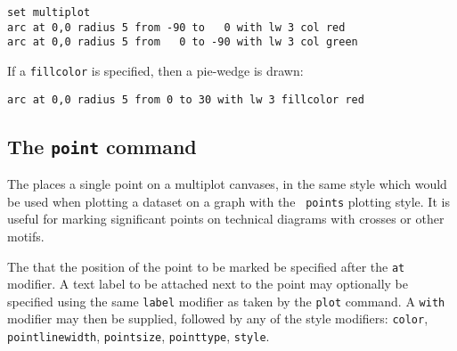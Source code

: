 \begin{verbatim}
set multiplot
arc at 0,0 radius 5 from -90 to   0 with lw 3 col red
arc at 0,0 radius 5 from   0 to -90 with lw 3 col green
\end{verbatim}

\noindent If a {\tt fillcolor} is specified, then a pie-wedge is drawn:

\begin{verbatim}
arc at 0,0 radius 5 from 0 to 30 with lw 3 fillcolor red
\end{verbatim}



\subsection{The {\tt point} command}
\label{sec:point}

The  places a single point on a multiplot canvases, in the same
style which would be used when plotting a dataset on a graph with the {\tt
points} plotting style. It is useful for marking significant points on
technical diagrams with crosses or other motifs.

The  that the position of the point to be marked be specified
after the {\tt at} modifier. A text label to be attached next to the point may
optionally be specified using the same {\tt label} modifier as taken by the
{\tt plot} command. A {\tt with} modifier may then be supplied, followed by any
of the style modifiers: {\tt color}, {\tt pointlinewidth}, {\tt pointsize},
{\tt pointtype}, {\tt style}.

